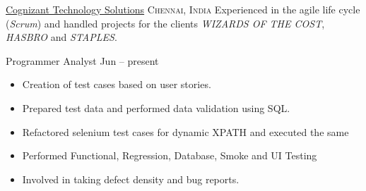 
\headedsection  %
  {\href{https://www.cognizant.com}{Cognizant Technology Solutions}}
  {\textsc{Chennai, India}} 
  {\newline{}Experienced in the agile life cycle (\emph{Scrum}) and handled projects for the clients  \emph{WIZARDS OF THE COST}, \emph{HASBRO} and \emph{STAPLES}.
} 
  {%
  \headedsubsection
    {Programmer Analyst}
    {Jun  -- present}
    {\begin{itemize}
        \item Creation of test cases based on user stories. 
        \item Prepared test data and performed data validation using SQL.
        \item Refactored selenium test cases for dynamic XPATH and executed the same
        \item Performed Functional, Regression, Database, Smoke and UI Testing
        \item Involved in taking defect density and bug reports. 
    \end{itemize}
    }
}
